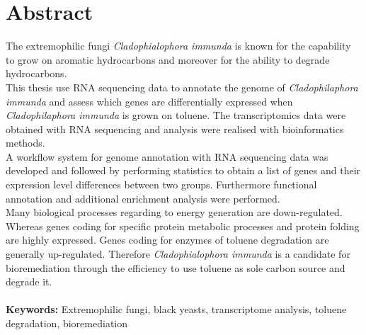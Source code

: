 \documentclass[12pt, a4paper]{report}
\begin{document}
\section*{Abstract}
The extremophilic fungi \textit{Cladophialophora immunda} is known for the capability to grow on aromatic hydrocarbons and moreover for the ability to degrade hydrocarbons.\\
This thesis use RNA sequencing data to annotate the genome of \textit{Cladophilaphora immunda} and assess which genes are differentially expressed when \textit{Cladophilaphora immunda} is grown on toluene. The transcriptomics data were obtained with RNA sequencing and analysis were realised with bioinformatics methods. \\
A workflow system for genome annotation with RNA sequencing data was developed and followed by performing statistics to obtain a list of genes and their expression level differences between two groups. Furthermore functional annotation and additional enrichment analysis were performed.\\
Many biological processes regarding to energy generation are down-regulated. Whereas genes coding for specific protein metabolic processes and protein folding are highly expressed. Genes coding for enzymes of toluene degradation are generally up-regulated. Therefore \textit{Cladophialophora immunda} is a candidate for bioremediation through the efficiency to use toluene as sole carbon source and degrade it. \\
\ \\
\textbf{Keywords:} Extremophilic fungi, black yeasts, transcriptome analysis, toluene degradation, bioremediation
\newpage
\end{document}
